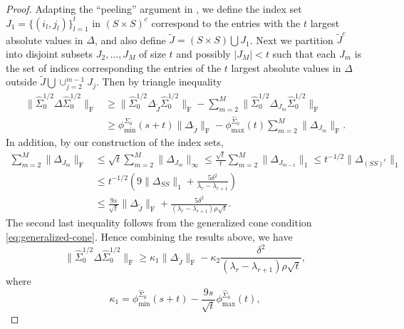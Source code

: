 \documentclass[11pt]{article}
\newcommand{\0}{{\mathbf{0}}}
\newcommand{\tJ}{{\widetilde{J}}}
\begin{document}
\begin{proof}
\par Adapting the ``peeling'' argument in \cite{bickel2009simultaneous}, we define the index set $J_1=\{(i_l,j_l)\}_{l=1}^{t}$ in $(S\times S)^c$ correspond to the entries with the $t$ largest absolute values in $\Delta$, and also define $\widetilde{J}=(S\times S)\bigcup J_1$. Next we partition $\widetilde{J}^c$ into disjoint subsets $J_2,...,J_M$ of size $t$ and possibly $|J_M|<t$ such that each $J_m$ is the set of indices corresponding the entries of the $t$ largest absolute values in $\Delta$ outside $\tJ\bigcup \cup_{j=2}^{m-1}J_j$. Then by triangle inequality
\begin{align*}
  \|\widehat{\Sigma}^{1/2}_0\Delta\widehat{\Sigma}^{1/2}_0\|_\mathrm{F} &\geq \|\widehat{\Sigma}^{1/2}_0\Delta_{\tJ}\widehat{\Sigma}^{1/2}_0\|_\mathrm{F}-\sum_{m=2}^M\|\widehat{\Sigma}^{1/2}_0\Delta_{J_m}\widehat{\Sigma}^{1/2}_0\|_\mathrm{F} \\
  &\geq \phi_{\min}^{\widehat{\Sigma}_0}(s+t)\|\Delta_{\tJ}\|_\mathrm{F}-
  \phi_{\max}^{\widehat{\Sigma}_0}(t)\sum_{m=2}^M \|\Delta_{J_m}\|_\mathrm{F}.
\end{align*}
In addition, by our construction of the index sets,
\begin{align*}
    \sum_{m=2}^M \|\Delta_{J_m}\|_\mathrm{F}&\leq \sqrt{t} \sum_{m=2}^M\|\Delta_{J_m}\|_\infty\leq \frac{\sqrt{t}}{t}\sum_{m=2}^M\|\Delta_{J_{m-1}}\|_1
      \leq t^{-1/2}\|\Delta_{(SS)^c}\|_1\\
      & \leq t^{-1/2}(9\|\Delta_{SS}\|_1+\frac{5\delta^2}{\lambda_r-\lambda_{r+1}})\\
    &\leq \frac{9s}{\sqrt{t}}\|\Delta_{\tJ}\|_\mathrm{F}+\frac{5\delta^2}{(\lambda_r-\lambda_{r+1})\rho\sqrt{t}}.
\end{align*}
The second last inequality follows from the generalized cone condition \eqref{eq:generalized-cone}. Hence combining the results above, we have \begin{equation}
\label{eq:Delta-bd-2}
\|\widehat{\Sigma}^{1/2}_0\Delta\widehat{\Sigma}^{1/2}_0\|_\mathrm{F}\geq \kappa_1\|\Delta_{\tJ}\|_\mathrm{F}-\kappa_2\frac{\delta^2}{(\lambda_r-\lambda_{r+1})\rho\sqrt{t}},
\end{equation}
where\begin{equation*}
    \kappa_1= \phi_{\min}^{\widehat{\Sigma}_0}(s+t)-\frac{9s}{\sqrt{t}} \phi_{\max}^{\widehat{\Sigma}_0}(t),
\end{equation*}
\begin{equation*}

\end{equation*}
\end{proof}
\end{document}
